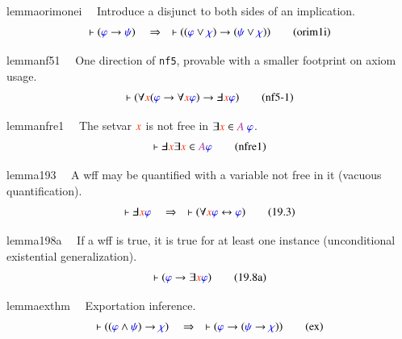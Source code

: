 \begin{restatable}{lemma}{orimonei}~~ Introduce a disjunct to both sides of an
implication.
\begin{align}
\vdash ( \mw{\varphi} \rightarrow \mw{\psi} )\quad\Rightarrow\quad \vdash ( (
    \mw{\varphi} \vee \mw{\chi} ) \rightarrow ( \mw{\psi} \vee \mw{\chi} )
    )\label{eq:orim1i}\tag{orim1i}
\end{align}
\end{restatable}

\begin{restatable}{lemma}{nf51}~~ One direction of \texttt{nf5}, provable with a
smaller footprint on axiom usage.
\begin{align}
\vdash ( \forall \msc{x} ( \mw{\varphi} \rightarrow \forall \msc{x}
    \mw{\varphi} ) \rightarrow \Finv \msc{x} \mw{\varphi}
    )\label{eq:nf5-1}\tag{nf5-1}
\end{align}
\end{restatable}

\begin{restatable}{lemma}{nfre1}~~ The setvar $\msc{x}$ is not free in $\exists
\msc{x} \in \mc{A}~\mw{\varphi}$.
\begin{align}
\vdash \Finv \msc{x} \exists \msc{x} \in \mc{A}
    \mw{\varphi}\label{eq:nfre1}\tag{nfre1}
\end{align}
\end{restatable}

\begin{restatable}{lemma}{193}~~ A wff may be quantified with a variable not free
in it (vacuous quantification).
\begin{align}
\vdash \Finv \msc{x} \mw{\varphi}\quad\Rightarrow\quad \vdash ( \forall
    \msc{x} \mw{\varphi} \leftrightarrow \mw{\varphi}
    )\label{eq:19.3}\tag{19.3}
\end{align}
\end{restatable}

\begin{restatable}{lemma}{198a}~~ If a wff is true, it is true for at least one
instance (unconditional existential generalization).
\begin{align}
\vdash ( \mw{\varphi} \rightarrow \exists \msc{x} \mw{\varphi}
    )\label{eq:19.8a}\tag{19.8a}
\end{align}
\end{restatable}

\begin{restatable}{lemma}{exthm}~~ Exportation inference.
\begin{align}
\vdash ( ( \mw{\varphi} \wedge \mw{\psi} ) \rightarrow \mw{\chi}
    )\quad\Rightarrow\quad \vdash ( \mw{\varphi} \rightarrow ( \mw{\psi}
    \rightarrow \mw{\chi} ) )\label{eq:ex}\tag{ex}
\end{align}
\end{restatable}

